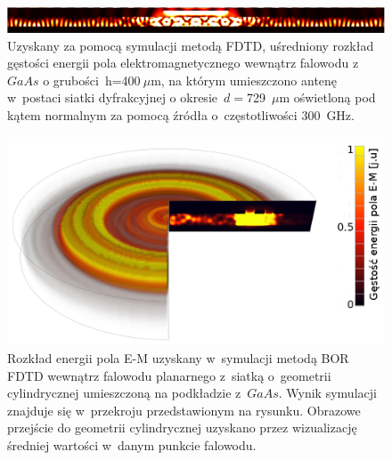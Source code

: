 \begin{figure}[tb]
	\includegraphics[width=\textwidth]{images/thz/consrc_siatka1d_300GHz_d729um.png}
	\caption{Uzyskany za pomocą symulacji metodą FDTD, uśredniony rozkład gęstości energii pola elektromagnetycznego wewnątrz falowodu z~$GaAs$ o grubości~h=400$~\mu$m, na którym umieszczono antenę w~postaci siatki dyfrakcyjnej o okresie~$d=$729~$\mu$m oświetloną pod kątem normalnym za pomocą źródła o~częstotliwości 300~GHz.  }
	\label{fig:consrc_1d_f300Ghz}
\end{figure}

\begin{figure}[tb]
	\includegraphics[width=\textwidth]{images/antenaThz/tort.png}
	\caption{Rozkład energii pola E-M uzyskany w~symulacji metodą BOR FDTD wewnątrz falowodu planarnego z~siatką o~geometrii cylindrycznej umieszczoną na podkładzie z~$GaAs$. Wynik symulacji znajduje się w~przekroju przedstawionym na rysunku. Obrazowe przejście do geometrii cylindrycznej uzyskano przez wizualizację średniej wartości w~danym punkcie falowodu.}	
	\label{fig:concent_modfalo}
\end{figure}

